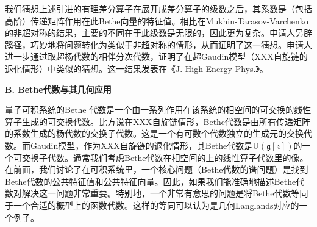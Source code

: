\documentclass[12pt,UTF8,AutoFakeBold=4,a4paper]{ctexart}
\begin{document}
我们猜想上述引进的有理差分算子在展开成差分算子的级数之后，其系数是（包括高阶）传递矩阵作用在此Bethe向量的特征值。相比在Mukhin-Tarasov-Varchenko的非超对称的结果，主要的不同在于此级数是无限的，因此更为复杂。申请人另辟蹊径，巧妙地将问题转化为类似于非超对称的情形，从而证明了这一猜想。申请人进一步通过取超杨代数的相伴分次代数，证明了在超Gaudin模型（XXX自旋链的退化情形）中类似的猜想。这一结果发表在《J. High Energy Phys.》。





\textbf{B. Bethe代数与其几何应用}

量子可积系统的Bethe 代数是一个由一系列作用在该系统的相空间的可交换的线性算子生成的可交换代数。比方说在XXX自旋链情形，Bethe代数是由所有传递矩阵的系数生成的杨代数的交换子代数。这是一个有可数个代数独立的生成元的交换代数。而Gaudin模型，作为XXX自旋链的退化情形，其Bethe代数是$\mathrm{U}(\mathfrak{g}[z])$的一个可交换子代数。通常我们考虑Bethe代数在相空间的上的线性算子代数里的像。在前面，我们讨论了在可积系统里，一个核心问题（Bethe代数的谱问题）是找到Bethe代数的公共特征值和公共特征向量。因此，如果我们能准确地描述Bethe代数对解决这一问题非常重要。特别地，一个非常有意思的问题是将Bethe代数等同于一个合适的概型上的函数代数。这样的等同可以认为是几何Langlands对应的一个例子。
\end{document}
